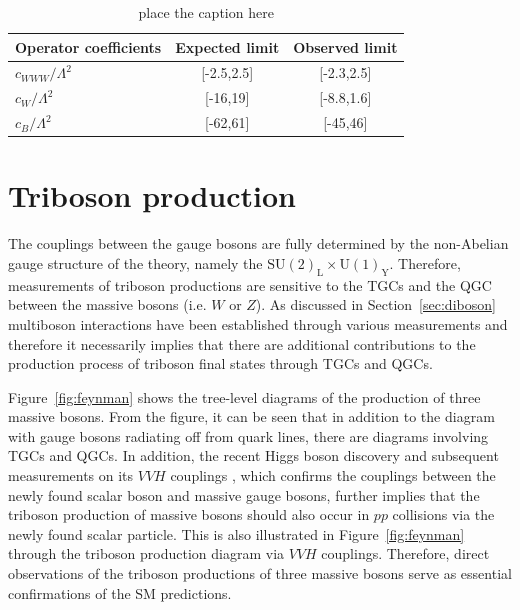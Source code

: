 \begin{table}[t]
\begin{center}
\caption{ place the caption here }
\label{tab:CMSVBFWLimits}
\begin{tabular}{l|cc}
Operator coefficients & Expected limit & Observed limit\\ \hline
$c_{WWW} / \Lambda^2$ & [-2.5,2.5]     & [-2.3,2.5]    \\
$c_{W} / \Lambda^2$   & [-16,19]       & [-8.8,1.6]    \\
$c_{B} / \Lambda^2$   & [-62,61]       & [-45,46]      \\
\end{tabular}
\end{center}
\end{table}
\section{Triboson production}

The couplings between the gauge bosons are fully determined by the non-Abelian gauge structure of the theory, namely the $\textrm{SU}(2)_\textrm{L} \times \textrm{U}(1)_\textrm{Y}$.
Therefore, measurements of triboson productions are sensitive to the TGCs and the QGC between the massive bosons (i.e. $W$ or $Z$).
As discussed in Section~\ref{sec:diboson} multiboson interactions have been established through various measurements and therefore it necessarily implies that there are additional contributions to the production process of triboson final states through TGCs and QGCs.

Figure~\ref{fig:feynman} shows the tree-level diagrams of the production of three massive bosons.
From the figure, it can be seen that in addition to the diagram with gauge bosons radiating off from quark lines, there are diagrams involving TGCs and QGCs.
In addition, the recent Higgs boson discovery \cite{Aad:2012tfa,Chatrchyan:2012ufa} and subsequent measurements on its $VVH$ couplings \cite{Sirunyan:2018egh,Chatrchyan:2013iaa,Sirunyan:2019twz,Chatrchyan:2013mxa,Aaboud:2018jqu,Aaboud:2017vzb,ATLAS:2014aga,Aad:2014eva}, which confirms the couplings between the newly found scalar boson and massive gauge bosons, further implies that the triboson production of massive bosons should also occur in $pp$ collisions via the newly found scalar particle.
This is also illustrated in Figure~\ref{fig:feynman} through the triboson production diagram via $VVH$ couplings.
Therefore, direct observations of the triboson productions of three massive bosons serve as essential confirmations of the SM predictions.

